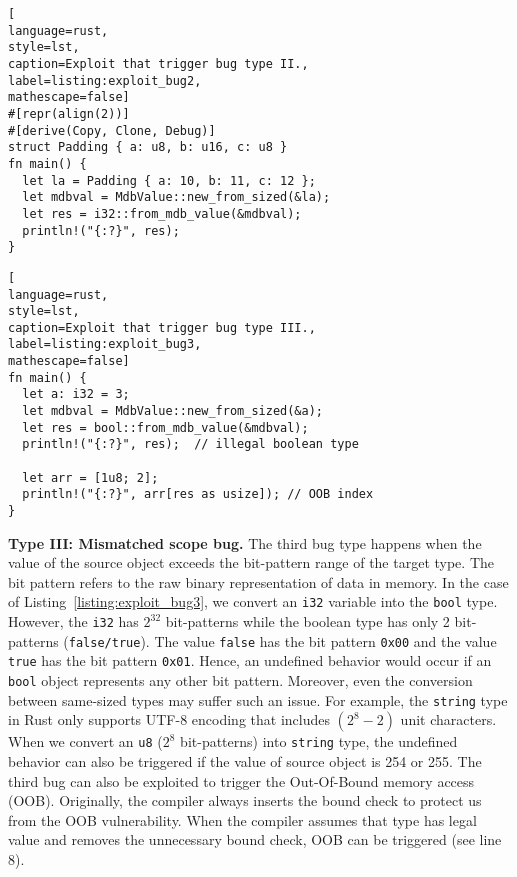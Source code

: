 \begin{appendix}
\begin{lstlisting}[
language=rust, 
style=lst,
caption=Exploit that trigger bug type II.,
label=listing:exploit_bug2,
mathescape=false]
#[repr(align(2))]
#[derive(Copy, Clone, Debug)]
struct Padding { a: u8, b: u16, c: u8 }
fn main() {
  let la = Padding { a: 10, b: 11, c: 12 };
  let mdbval = MdbValue::new_from_sized(&la);
  let res = i32::from_mdb_value(&mdbval);
  println!("{:?}", res);
}
\end{lstlisting}




\begin{lstlisting}[
language=rust, 
style=lst,
caption=Exploit that trigger bug type III.,
label=listing:exploit_bug3,
mathescape=false]
fn main() {
  let a: i32 = 3;
  let mdbval = MdbValue::new_from_sized(&a);
  let res = bool::from_mdb_value(&mdbval);
  println!("{:?}", res);  // illegal boolean type

  let arr = [1u8; 2];
  println!("{:?}", arr[res as usize]); // OOB index
}
\end{lstlisting}


\vspace{0.05in}
\noindent\textbf{Type III: Mismatched scope bug.} The third bug type happens when the value of the source object exceeds the bit-pattern range of the target type. The bit pattern refers to the raw binary representation of data in memory. In the case of Listing~\ref{listing:exploit_bug3}, we convert an \texttt{i32} variable into the \texttt{bool} type. However, the \texttt{i32} has $2^{32}$ bit-patterns while the boolean type has only 2 bit-patterns (\texttt{false/true}). The value \texttt{false} has the bit pattern \texttt{0x00} and the value \texttt{true} has the bit pattern \texttt{0x01}. Hence, an undefined behavior would occur if an \texttt{bool} object represents any other bit pattern.
Moreover, even the conversion between same-sized types may suffer such an issue. For example, the \texttt{string} type in Rust only supports UTF-8 encoding that includes $(2^8-2)$ unit characters. When we convert an \texttt{u8} ($2^8$ bit-patterns) into \texttt{string} type, the undefined behavior can also be triggered if the value of source object is 254 or 255. 
The third bug can also be exploited to trigger the Out-Of-Bound memory access (OOB). Originally, the compiler always inserts the bound check to protect us from the OOB vulnerability. When the compiler assumes that type has legal value and removes the unnecessary bound check, OOB can be triggered (see line 8).




\end{appendix}
